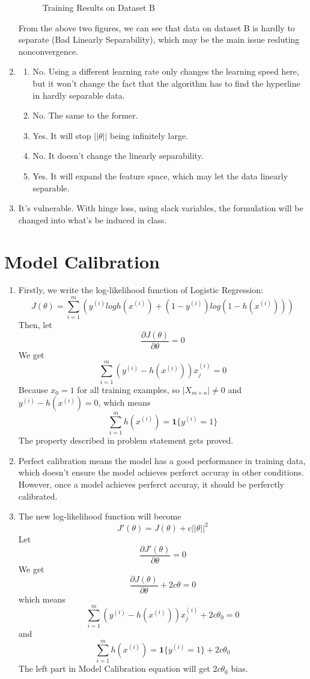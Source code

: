 \documentclass[12pt]{article}
\begin{document}
\begin{enumerate}[label=(\alph*)]
\begin{figure}[H]
        \caption{Training Results on Dataset B}
    \end{figure}
    From the above two figures, we can see that data on dataset B is hardly to separate (Bad Linearly Separability), which may be the main issue resluting nonconvergence.
    \item 
    \begin{enumerate}[label=\roman*]
        \item No. Using a different learning rate only changes the learning speed here, but it won't change the fact that the algorithm has to find the hyperline in hardly separable data.
        \item No. The same to the former.
        \item Yes. It will stop $||\theta||$ being infinitely large.
        \item No. It doesn't change the linearly separability.
        \item Yes. It will expand the feature space, which may let the data linearly separable.
    \end{enumerate}
    \item It's vulnerable. With hinge loss, using slack variables, the formulation will be changed into what's be induced in class.
    \end{enumerate}

    \newpage
    \section*{Model Calibration}
    \begin{enumerate}[label=(\alph*)]
    \item Firstly, we write the log-likelihood function of Logistic Regression:
    $$J(\theta) = \sum_{i=1}^m (y^{(i)}logh(x^{(i)})+(1-y^{(i)})log(1-h(x^{(i)})))$$
    Then, let $$ \frac{\partial J(\theta)}{\partial \theta} = 0 $$ 
    We get $$\sum_{i=1}^m(y^{(i)}-h(x^{(i)}))x^{(i)}_j = 0$$
    Because $x_0 = 1$ for all training examples, so $|X_{m\times n}|\neq 0$ and $y^{(i)}-h(x^{(i)}) = 0$, which means
    $$\sum_{i=1}^mh(x^{(i)}) = \boldsymbol{1}\{y^{(i)}=1\}$$
    The property described in problem statement gets proved.
    \item Perfect calibration means the model has a good performance in training data, which doesn't ensure the model achieves perferct accuray in other conditions.
    However, once a model achieves perferct accuray, it should be perferctly calibrated.
    \item The new log-likelihood function will become
    $$J'(\theta) = J(\theta)+c||\theta||^2 $$
    Let $$ \frac{\partial J'(\theta)}{\partial \theta} = 0 $$ 
    We get $$ \frac{\partial J(\theta)}{\partial \theta} +2c\theta = 0 $$
    which means $$\sum_{i=1}^m(y^{(i)}-h(x^{(i)}))x^{(i)}_j +2c\theta_0= 0$$
    and $$\sum_{i=1}^mh(x^{(i)}) = \boldsymbol{1}\{y^{(i)}=1\}+2c\theta_0$$
    The left part in Model Calibration equation will get $2c\theta_0$ bias.
    \end{enumerate}
\end{document}
